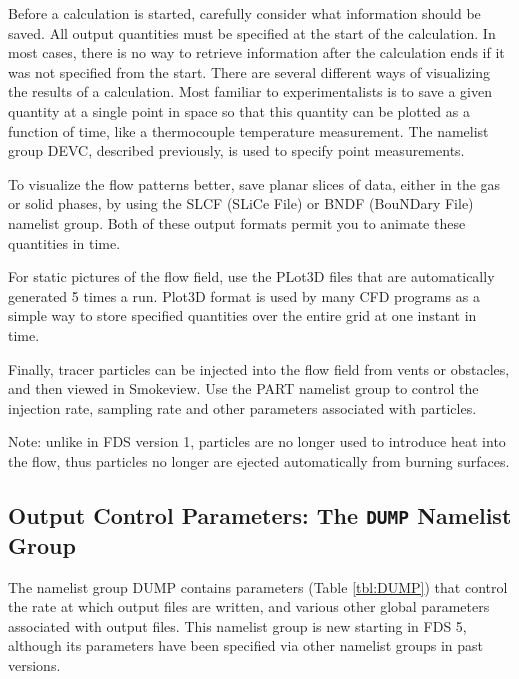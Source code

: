 \documentclass[11pt]{book}
\begin{document}
Before a calculation is started, carefully consider
what information should be saved. All output quantities must be specified
at the start of the calculation. In most cases, there is no way to
retrieve information after the calculation ends if it was not specified from the start.
There are several different ways of visualizing the results of a
calculation. Most familiar to
experimentalists is to save a given quantity at a single point in space so
that this quantity can be plotted as a function of time, like a
thermocouple temperature measurement. The namelist group {\ct DEVC},
described previously, is used to specify point measurements.

To visualize the flow patterns better, save planar
slices of data, either in the gas or solid phases, by using the
{\ct SLCF} (SLiCe File) or {\ct BNDF} (BouNDary File) namelist group.
Both of these output formats permit you to animate these quantities in
time.

For static pictures of the flow field, use the PLot3D files
that are automatically generated 5 times a run. Plot3D format is used by many CFD programs as a simple
way to store specified quantities over the entire grid at one instant in
time.

Finally, tracer particles can be injected into the flow field from
vents or obstacles, and then viewed in Smokeview. Use the {\ct PART}
namelist group to control the injection rate, sampling rate and other
parameters associated with particles.

\begin{warning}
\noindent
Note: unlike in FDS version 1,
particles are no longer used to introduce heat into the flow, thus
particles no longer are ejected automatically from burning surfaces.
\end{warning}

\subsection{Output Control Parameters: The \texorpdfstring{{\tt DUMP}}{DUMP} Namelist Group}
\label{info:DUMP}

The namelist group {\ct DUMP} contains parameters (Table \ref{tbl:DUMP}) that control the rate at which output files
are written, and various other global parameters associated with output files.
This namelist group is new starting in FDS 5, although its
parameters have been specified via other namelist groups in past versions.
\end{document}
